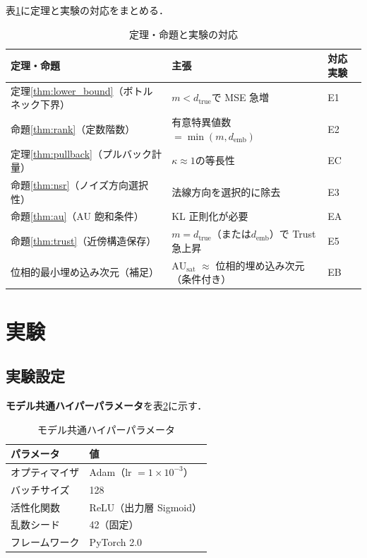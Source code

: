 \documentclass[12pt,a4paper]{jsarticle}
\newcommand{\dtrue}{d_{\mathrm{true}}}
\newcommand{\kap}{\kappa}
\newcommand{\AUsat}{\mathrm{AU}_{\mathrm{sat}}}
\newcommand{\demb}{d_{\mathrm{emb}}}
\begin{document}
表\ref{tab:theorem_exp}に定理と実験の対応をまとめる．

\begin{table}[H]
\centering
\caption{定理・命題と実験の対応}
\label{tab:theorem_exp}
\begin{tabular}{lll}
\toprule
定理・命題 & 主張 & 対応実験 \\
\midrule
定理\ref{thm:lower_bound}（ボトルネック下界） & $m < \dtrue$で MSE 急増 & E1 \\
命題\ref{thm:rank}（定数階数） & 有意特異値数 $= \min(m,\demb)$ & E2 \\
定理\ref{thm:pullback}（プルバック計量） & $\kap \approx 1$の等長性 & EC \\
命題\ref{thm:nsr}（ノイズ方向選択性） & 法線方向を選択的に除去 & E3 \\
命題\ref{thm:au}（AU 飽和条件） & KL 正則化が必要 & EA \\
命題\ref{thm:trust}（近傍構造保存） & $m = \dtrue$（または$\demb$）で Trust 急上昇 & E5 \\
位相的最小埋め込み次元（補足） & $\AUsat$ $\approx$ 位相的埋め込み次元（条件付き） & EB \\
\bottomrule
\end{tabular}
\end{table}

\section{実験}\label{sec:exp}

\subsection{実験設定}\label{sec:exp_setup}

\textbf{モデル共通ハイパーパラメータ}を表\ref{tab:common_hp}に示す．

\begin{table}[H]
\centering
\caption{モデル共通ハイパーパラメータ}
\label{tab:common_hp}
\begin{tabular}{ll}
\toprule
パラメータ & 値 \\
\midrule
オプティマイザ & Adam（lr $= 1\times10^{-3}$） \\
バッチサイズ & 128 \\
活性化関数 & ReLU（出力層 Sigmoid） \\
乱数シード & 42（固定） \\
フレームワーク & PyTorch 2.0 \\
\bottomrule
\end{tabular}
\end{table}
\end{document}
